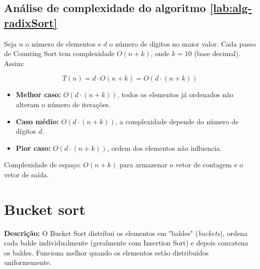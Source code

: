 \subsection{Análise de complexidade do algoritmo \ref{lab:alg-radixSort}}

Seja $n$ o número de elementos e $d$ o número de dígitos no maior valor. Cada passo de Counting Sort tem complexidade $O(n + k)$, onde $k=10$ (base decimal). Assim:

\[
T(n) = d \cdot O(n + k) = O(d \cdot (n + k))
\]

\begin{itemize}
    \item \textbf{Melhor caso:} $O(d \cdot (n+k))$, todos os elementos já ordenados não alteram o número de iterações.
    \item \textbf{Caso médio:} $O(d \cdot (n+k))$, a complexidade depende do número de dígitos $d$.
    \item \textbf{Pior caso:} $O(d \cdot (n+k))$, ordem dos elementos não influencia.
\end{itemize}

Complexidade de espaço: $O(n+k)$ para armazenar o vetor de contagem e o vetor de saída.

\section{Bucket sort}
\textbf{Descrição:} O Bucket Sort distribui os elementos em "baldes" (\textit{buckets}), ordena cada balde individualmente (geralmente com Insertion Sort) e depois concatena os baldes. Funciona melhor quando os elementos estão distribuídos uniformemente.

